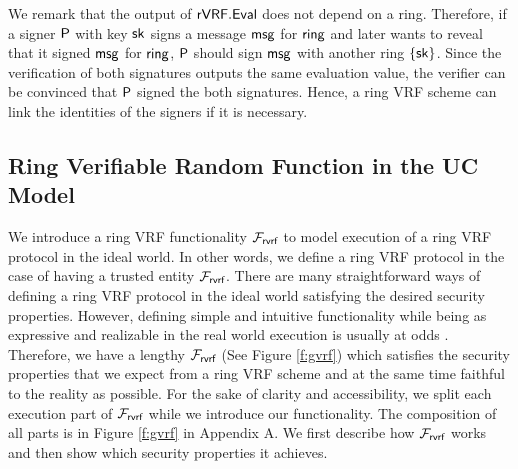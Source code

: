 We remark that the output of $ {\mathsf{rVRF}}.{\mathsf{Eval}} $ does not depend on a ring. Therefore, if a signer $ \mathsf{P} $ with key $ \mathsf{sk} $ signs a message $ \mathsf{msg} $ for $ \mathsf{ring} $ and later wants to reveal that it signed $ \mathsf{msg} $  for $ \mathsf{ring} $, $ \mathsf{P} $ should sign $ \mathsf{msg} $ with another ring $ \{\mathsf{sk}\} $. Since the verification of both signatures outputs the same evaluation value, the verifier can be convinced that $ \mathsf{P} $ signed the both signatures. Hence, a ring VRF scheme can link the identities of the signers if it is necessary.




\subsection{Ring Verifiable Random Function in the UC Model}
\label{subsec:uc_model}
We introduce a ring VRF functionality $ \mathcal{F}_{\textsf{rvrf}} $ to model execution of a ring VRF protocol in the ideal world. In other words, we define a ring VRF protocol in the case of having a trusted entity $ \mathcal{F}_{\textsf{rvrf}} $. There are many straightforward ways of defining a ring VRF protocol in the ideal world satisfying the desired security properties. However, defining simple and intuitive functionality while being as expressive and realizable in the real world execution is usually at odds \cite{canetti1}. Therefore, we have a lengthy $ \mathcal{F}_{\textsf{rvrf}} $ (See Figure \ref{f:gvrf}) which satisfies the security properties that we expect from a ring VRF scheme and at the same time faithful to the reality as possible. For the sake of clarity and accessibility, we split each execution part of $ \mathcal{F}_{\textsf{rvrf}} $ while we introduce our functionality. The composition of all parts is in Figure \ref{f:gvrf} in Appendix A. We first describe how $  \mathcal{F}_{\textsf{rvrf}} $ works and then show which security properties it achieves.


